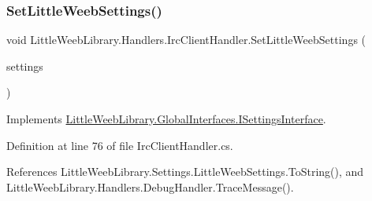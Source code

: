 \subsubsection{\texorpdfstring{Set\+Little\+Weeb\+Settings()}{SetLittleWeebSettings()}}
{\footnotesize\ttfamily void Little\+Weeb\+Library.\+Handlers.\+Irc\+Client\+Handler.\+Set\+Little\+Weeb\+Settings (\begin{DoxyParamCaption}\item[{\mbox{\hyperlink{class_little_weeb_library_1_1_settings_1_1_little_weeb_settings}{Little\+Weeb\+Settings}}}]{settings }\end{DoxyParamCaption})}



Implements \mbox{\hyperlink{interface_little_weeb_library_1_1_global_interfaces_1_1_i_settings_interface_a5c53e44105f1f4c7f8c3e546d29939d7}{Little\+Weeb\+Library.\+Global\+Interfaces.\+I\+Settings\+Interface}}.



Definition at line 76 of file Irc\+Client\+Handler.\+cs.



References Little\+Weeb\+Library.\+Settings.\+Little\+Weeb\+Settings.\+To\+String(), and Little\+Weeb\+Library.\+Handlers.\+Debug\+Handler.\+Trace\+Message().


